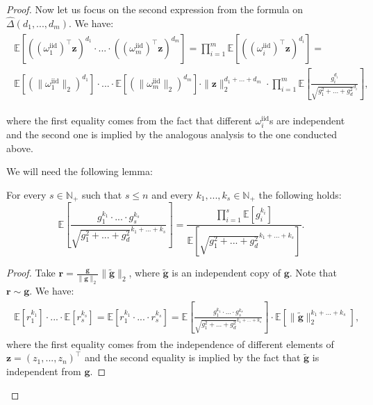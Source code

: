 \begin{proof}
Now let us focus on the second expression from the formula on $\widehat{\Delta}(d_{1},...,d_{m})$. We have:
\begin{align}
\begin{split}
\label{rhs}
\mathbb{E}[((\omega_{1}^{\mathrm{iid}})^{\top}\mathbf{z})^{d_{1}} \cdot ... \cdot ((\omega_{m}^{\mathrm{iid}})^{\top}\mathbf{z})^{d_{m}}] = \prod_{i=1}^{m} \mathbb{E}[((\omega_{i}^{\mathrm{iid}})^{\top}\mathbf{z})^{d_{i}}]   
= \\ \mathbb{E}[(\|\omega_{1}^{\mathrm{iid}}\|_{2})^{d_{1}}] \cdot ... \cdot \mathbb{E}[(\|\omega_{m}^{\mathrm{iid}}\|_{2})^{d_{m}}] \cdot \|\mathbf{z}\|_{2}^{d_{1}+...+d_{m}} \cdot \prod_{i=1}^{m} \mathbb{E}[\frac{g_{i}^{d_{i}}}{\sqrt{g_{1}^{2}+...+g_{d}^{2}}^{d_{i}}}],
\end{split}
\end{align}

where the first equality comes from the fact that
different $\omega_{i}^{\mathrm{iid}}$s are independent and the second one is implied by the analogous analysis to the one conducted above.

We will need the following lemma:

\begin{lemma}
\label{useful-lemma}
For every $s \in \mathbb{N}_{+}$ such that $s \leq n$ and every $k_{1},...,k_{s} \in \mathbb{N}_{+}$ the following holds:
\begin{equation}
\mathbb{E}[\frac{g_{1}^{k_{1}} \cdot ... \cdot g_{s}^{k_{s}}}{\sqrt{g_{1}^{2}+...+g_{d}^{2}}^{k_{1}+...+k_{s}}}] = \frac{\prod_{i=1}^{s}\mathbb{E}[g_{i}^{k_{i}}]}{\mathbb{E}[\sqrt{g_{1}^{2}+...+g_{d}^{2}}^{k_{1}+...+k_{s}}]}.    
\end{equation}
\end{lemma}

\begin{proof}
Take $\mathbf{r} = \frac{\mathbf{g}}{\|\mathbf{g}\|_{2}}\|\tilde{\mathbf{g}}\|_{2}$, where $\tilde{\mathbf{g}}$ is an independent copy of $\mathbf{g}$. Note that $\mathbf{r} \sim \mathbf{g}$.
We have:
\begin{align}
\begin{split}
\mathbb{E}[r_{1}^{k_{1}}] \cdot ... \cdot     
\mathbb{E}[r_{s}^{k_{s}}] = 
\mathbb{E}[r_{1}^{k_{1}} \cdot ... \cdot r_{s}^{k_{s}}]
= \mathbb{E}[\frac{g_{1}^{k_{1}} \cdot ... \cdot g_{s}^{k_{s}}}{\sqrt{g_{1}^{2}+...+g_{d}^{2}}^{k_{1}+...+k_{s}}}]
\cdot \mathbb{E}[\|\tilde{\mathbf{g}}\|_{2}^{k_{1}+...+k_{s}}],
\end{split}    
\end{align}
where the first equality comes from the independence of different elements of $\mathbf{z}=(z_{1},...,z_{n})^{\top}$
and the second equality is implied by the fact that $\tilde{\mathbf{g}}$ is independent from $\mathbf{g}$.


\end{proof}
\end{proof}
